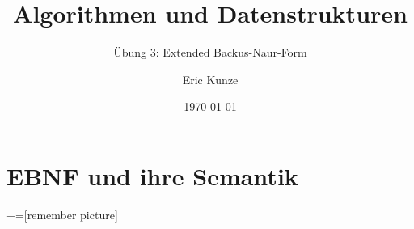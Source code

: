 \documentclass{beamer}
\begin{document}
	
	\title{Algorithmen und Datenstrukturen}
	\subtitle{Übung 3: Extended Backus-Naur-Form}
	\author{Eric Kunze}
	\date{\today}

	\maketitle



\section{EBNF und ihre Semantik}

+=[remember picture]
\end{document}
